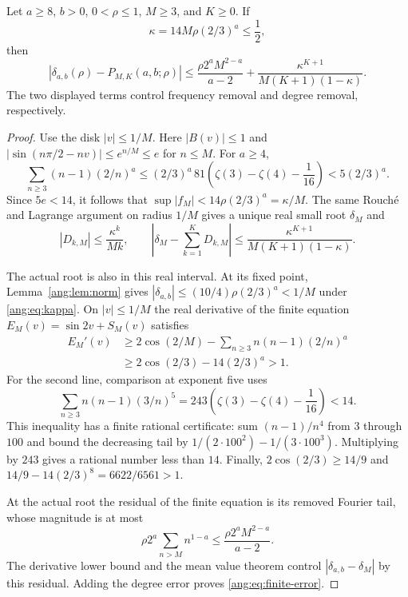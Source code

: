 \begin{theorem}
\label{ang:thm:finite}
Let $a\ge8$, $b>0$, $0<\rho\le1$, $M\ge3$, and $K\ge0$.
If
\begin{equation}
 \kappa=14M\rho(2/3)^a\le\frac12,
 \label{ang:eq:kappa}
\end{equation}
then
\begin{equation}
 \left|\delta_{a,b}(\rho)-P_{M,K}(a,b;\rho)\right|
 \le \frac{\rho2^aM^{2-a}}{a-2}
     +\frac{\kappa^{K+1}}{M(K+1)(1-\kappa)}.
 \label{ang:eq:finite-error}
\end{equation}
The two displayed terms control frequency removal and degree removal,
respectively.
\end{theorem}
\begin{proof}
Use the disk $|v|\le1/M$. Here $|B(v)|\le1$ and
$|\sin(n\pi/2-nv)|\le e^{n/M}\le e$ for $n\le M$.
For $a\ge4$,
\[
 \sum_{n\ge3}(n-1)(2/n)^a
 \le (2/3)^a\,81\left(\zeta(3)-\zeta(4)-\frac1{16}\right)
 <5(2/3)^a.
\]
Since $5e<14$, it follows that
$\sup|f_M|<14\rho(2/3)^a=\kappa/M$.
The same Rouch\'e and Lagrange argument on radius $1/M$ gives
a unique real small root $\delta_M$ and
\[
 |D_{k,M}|\le\frac{\kappa^k}{Mk},\qquad
 \left|\delta_M-\sum_{k=1}^K D_{k,M}\right|
 \le\frac{\kappa^{K+1}}{M(K+1)(1-\kappa)}.
\]

The actual root is also in this real interval. At its fixed point,
Lemma~\ref{ang:lem:norm} gives
$|\delta_{a,b}|\le(10/4)\rho(2/3)^a<1/M$ under
\eqref{ang:eq:kappa}. On $|v|\le1/M$ the real derivative of
the finite equation $E_M(v)=\sin2v+S_M(v)$ satisfies
\begin{align*}
 E_M'(v)
 &\ge2\cos(2/M)-\sum_{n\ge3}n(n-1)(2/n)^a\\
 &\ge2\cos(2/3)-14(2/3)^a>1.
\end{align*}
For the second line, comparison at exponent five uses
\[
 \sum_{n\ge3}n(n-1)(3/n)^5
 =243\left(\zeta(3)-\zeta(4)-\frac1{16}\right)<14.
\]
This inequality has a finite rational certificate: sum
$(n-1)/n^4$ from $3$ through $100$ and bound the decreasing
tail by $1/(2\cdot100^2)-1/(3\cdot100^3)$. Multiplying by
$243$ gives a rational number less than $14$. Finally,
$2\cos(2/3)\ge14/9$ and
$14/9-14(2/3)^8=6622/6561>1$.

At the actual root the residual of the finite equation is its removed
Fourier tail, whose magnitude is at most
\[
 \rho2^a\sum_{n>M}n^{1-a}
 \le\frac{\rho2^aM^{2-a}}{a-2}.
\]
The derivative lower bound and the mean value theorem control
$|\delta_{a,b}-\delta_M|$ by this residual. Adding the degree
error proves \eqref{ang:eq:finite-error}.
\end{proof}

